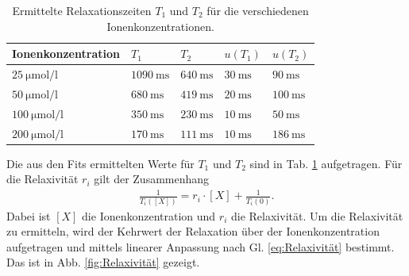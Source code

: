 \documentclass[../main.tex]{subfiles}
\begin{document}
    \begin{table}[H]
        \centering
        \begin{tabular}{l|llll}
        Ionenkonzentration                  & $T_{1}$                     & $T_{2}$                    & $u(T_{1})$                & $u(T_{2})$                 \\ \hline
        $\SI{25}{\micro \mol \per \litre}$  & $\SI{1090}{\milli \second}$ & $\SI{640}{\milli \second}$  & $\SI{30}{\milli \second}$ & $\SI{90}{\milli \second}$  \\
        $\SI{50}{\micro \mol \per \litre}$  & $\SI{680}{\milli \second}$  & $\SI{419}{\milli \second}$ & $\SI{20}{\milli \second}$ & $\SI{100}{\milli \second}$ \\
        $\SI{100}{\micro \mol \per \litre}$ & $\SI{350}{\milli \second}$  & $\SI{230}{\milli \second}$ & $\SI{10}{\milli \second}$ & $\SI{50}{\milli \second}$  \\
        $\SI{200}{\micro \mol \per \litre}$ & $\SI{170}{\milli \second}$  & $\SI{111}{\milli \second}$ & $\SI{10}{\milli \second}$ & $\SI{186}{\milli \second}$
        \end{tabular}
        \caption{Ermittelte Relaxationszeiten $T_{1}$ und $T_{2}$ für die verschiedenen Ionenkonzentrationen.}
        \label{tab:RelaxT}
    \end{table}
    Die aus den Fits ermittelten Werte für $T_{1}$ und $T_{2}$ sind in Tab. \ref{tab:RelaxT} aufgetragen. Für die Relaxivität $r_{i}$ gilt der Zusammenhang
    \begin{align} \label{eq:Relaxivität}
        \frac{1}{T_{i}([X])} = r_{i} \cdot [X] + \frac{1}{T_{i}(0)}.
    \end{align}
    Dabei ist $[X]$ die Ionenkonzentration und $r_{i}$ die Relaxivität. Um die Relaxivität zu ermitteln, wird der Kehrwert der Relaxation über der Ionenkonzentration aufgetragen und mittels linearer Anpassung nach Gl. \ref{eq:Relaxivität} bestimmt. Das ist in Abb. \ref{fig:Relaxivität} gezeigt.
\end{document}
